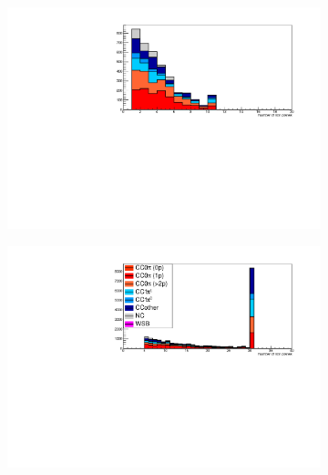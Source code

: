 %
\begin{figure}[tbh]
 \begin{center}
  \begin{subfigure}{0.48\textwidth}
     \includegraphics[width=\linewidth]{fig/FHCMuonPenetration_SideMRD_StoppedOrThroughGoing.pdf}
    \end{subfigure}
  \begin{subfigure}{0.48\textwidth}
    \includegraphics[width=\linewidth]{fig/FHCMuonPenetration_DownstreamMRD_StoppedOrThroughGoing.pdf}
    \end{subfigure}  
     \begin{subfigure}{0.48\textwidth}

\end{subfigure}
\end{center}
\end{figure}
